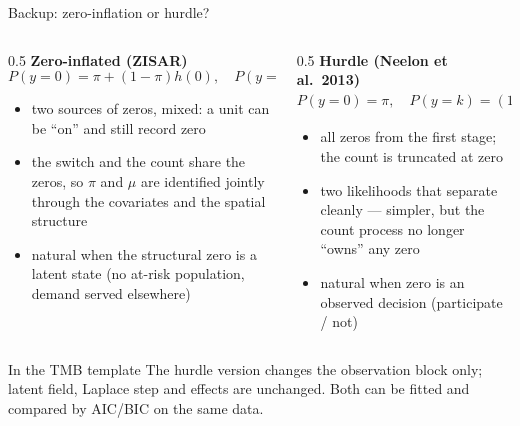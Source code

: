 \documentclass[10pt,aspectratio=169]{beamer}
\begin{document}
\begin{frame}{Backup: zero-inflation or hurdle?}
  \small
  \begin{columns}[T]
    \begin{column}{0.5\textwidth}
      \textbf{Zero-inflated (ZISAR)}
      \[
        P(y{=}0) = \pi + (1-\pi)h(0),\quad P(y{=}k) = (1-\pi)h(k)
      \]
      \begin{itemize}
        \item two sources of zeros, mixed: a unit can be ``on'' and still record zero
        \item the switch and the count share the zeros, so $\pi$ and $\mu$ are identified jointly through the covariates and the spatial structure
        \item natural when the structural zero is a latent state (no at-risk population, demand served elsewhere)
      \end{itemize}
    \end{column}
    \begin{column}{0.5\textwidth}
      \textbf{Hurdle (Neelon et al.\ 2013)}
      \[
        P(y{=}0) = \pi,\quad P(y{=}k) = (1-\pi)\,\tfrac{h(k)}{1-h(0)}
      \]
      \begin{itemize}
        \item all zeros from the first stage; the count is truncated at zero
        \item two likelihoods that separate cleanly --- simpler, but the count process no longer ``owns'' any zero
        \item natural when zero is an observed decision (participate / not)
      \end{itemize}
    \end{column}
  \end{columns}
  \vspace{0.3em}
  \begin{block}{In the TMB template}
    The hurdle version changes the observation block only; latent field, Laplace step and effects are unchanged. Both can be fitted and compared by AIC/BIC on the same data.
  \end{block}
\end{frame}
\end{document}
